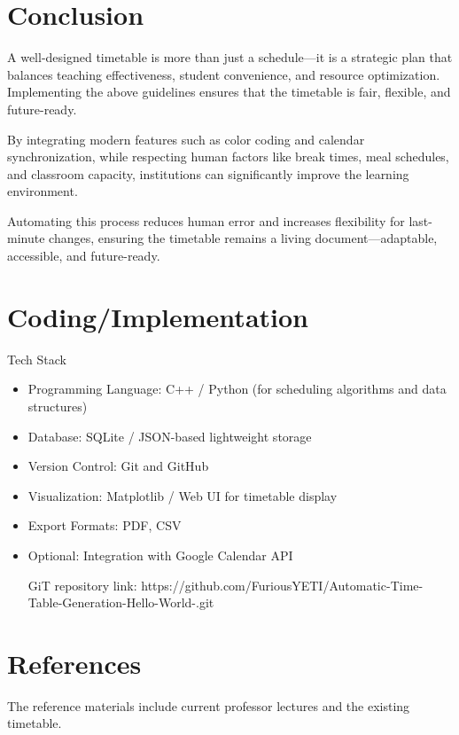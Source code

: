 \documentclass[12pt]{article}
\begin{document}
\section{Conclusion}
A well-designed timetable is more than just a schedule---it is a strategic plan that balances teaching effectiveness, student convenience, and resource optimization. Implementing the above guidelines ensures that the timetable is fair, flexible, and future-ready.

By integrating modern features such as color coding and calendar synchronization, while respecting human factors like break times, meal schedules, and classroom capacity, institutions can significantly improve the learning environment.

Automating this process reduces human error and increases flexibility for last-minute changes, ensuring the timetable remains a living document---adaptable, accessible, and future-ready.

\section{Coding/Implementation}
Tech Stack

\begin{itemize}
    \item Programming Language: C++ / Python (for scheduling algorithms and data structures)
    \item Database: SQLite / JSON-based lightweight storage
    \item Version Control: Git and GitHub
    \item Visualization: Matplotlib / Web UI for timetable display
    \item Export Formats: PDF, CSV
    \item Optional: Integration with Google Calendar API

GiT repository link: https://github.com/FuriousYETI/Automatic-Time-Table-Generation-Hello-World-.git
\end{itemize}
\section{References} %
{ %
\large
The reference materials include current professor lectures and the existing timetable.
}
\end{document}
